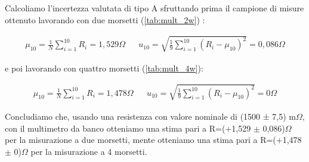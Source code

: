 \begin{table}[!ht]
    \caption{Multimetro 34401A (6$\sfrac{1}{2}$ cifre), 4 Morsetti, R (dei morsetti) = 0,004 $\Omega$}
    \label{tab:mult_4w}
\end{table}
\FloatBarrier
\clearpage

Calcoliamo l'incertezza valutata di tipo A sfruttando prima il campione di misure ottenuto lavorando con due morsetti (\ref{tab:mult_2w}) :

\begin{align*}
    \mu_{10}=\frac{1}{N}\sum_{i=1}^{10}R_{i}=1,529\Omega  &&  u_{10}=\sqrt{\frac{1}{9}\sum_{i=1}^{10}(R_i-\mu_{10})^{2}}=0,086\Omega 
\end{align*}
\FloatBarrier

e poi lavorando con quattro morsetti (\ref{tab:mult_4w}):

\begin{align*}
    \mu_{10}=\frac{1}{N}\sum_{i=1}^{10}R_{i}=1,478\Omega && u_{10}=\sqrt{\frac{1}{9}\sum_{i=1}^{10}(R_i-\mu_{10})^{2}}=0\Omega 
\end{align*}
\FloatBarrier

Concludiamo che, usando una resistenza con valore nominale di (1500 ± 7,5) m$\Omega$, con il multimetro da banco otteniamo una stima pari a R=(+1,529 $\pm$ 0,086)$\Omega$ per la misurazione a due morsetti, mente otteniamo una stima pari a R=(+1,478 $\pm$ 0)$\Omega$ per la misurazione a 4 morsetti.

